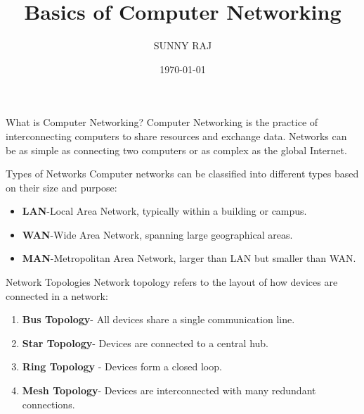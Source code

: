 \documentclass[11pt]{beamer}
\begin{document}
	\author{SUNNY RAJ}
	\title{Basics of Computer Networking}
	\date{\today}
	\begin{frame}[plain]
		\maketitle
	\end{frame}
	
	\begin{frame}
		{What is Computer Networking?}
		Computer Networking is the practice of interconnecting computers
		to share resources and exchange data. Networks can be as simple
		as connecting two computers or as complex as the global Internet.
	\end{frame}
	\begin{frame}
		{Types of Networks}
		Computer networks can be classified into different types based on
		their size and purpose:
		\begin{itemize}
			\item \textbf{LAN}-Local Area Network, typically within a building or
			campus.
			\item
			\textbf{WAN}-Wide Area Network, spanning large geographical
			areas.
			\item
			\textbf{MAN}-Metropolitan Area Network, larger than LAN but
			smaller than WAN.
		\end{itemize}
	\end{frame}
	\begin{frame}
		{Network Topologies}
		Network topology refers to the layout of how devices are connected
		in a network:
		\begin{enumerate}
			\item
			\textbf{Bus Topology}- All devices share a single communication line.
			\item
			\textbf{Star Topology}- Devices are connected to a central hub.
			\item
			\textbf{Ring Topology} - Devices form a closed loop.
			\item
			\textbf{Mesh Topology}- Devices are interconnected with many
			redundant connections.
		\end{enumerate}
	\end{frame}
	
\end{document}
